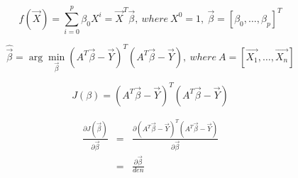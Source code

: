 \documentclass[letterpaper,10pt]{article}
\begin{document}
$$f(\vec{X})=\sum_{i=0}^{p}{\beta_0X^{i}}=\vec{X}^T\vec{\beta},~where~X^0=1,~\vec{\beta}=[\beta_0,\dots,\beta_p]^T$$

$$\hat{\vec{\beta}}=\arg\min_{\vec{\beta}}(A^T\vec{\beta}-\vec{Y})^T(A^T\vec{\beta}-\vec{Y}),~where~A=[\vec{X_1},\dots,\vec{X_n}]$$

$$J(\beta)=(A^T\vec{\beta}-\vec{Y})^T(A^T\vec{\beta}-\vec{Y})$$

\begin{equation*}
\begin{array}{rcl}
\frac{\partial J(\vec{\beta})}{\partial \vec{\beta}} & = & \frac{\partial (A^T\vec{\beta}-\vec{Y})^T(A^T\vec{\beta}-\vec{Y})}{\partial \vec{\beta}} \\
& = & \frac{\partial \vec{\beta}}{den}
\end{array}
\end{equation*}
\end{document}
